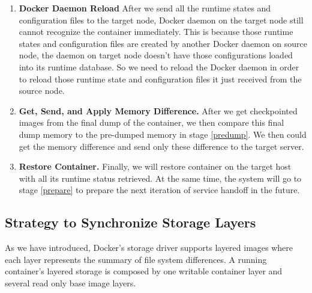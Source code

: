 \begin{enumerate}[label=\textbf{S\arabic*}]
\item \label{daemon-Reload} \textbf{Docker Daemon Reload} After we send all the runtime states and configuration files to the target node, Docker daemon on the target node still cannot recognize the container immediately.  This is because those runtime states and configuration files are created by another Docker daemon on source node, the daemon on target node doesn't have those configurations loaded into its runtime database. So we need to reload the Docker daemon in order to reload those runtime state and configuration files it just received from the source node.

\item \label{img-sync} \textbf{Get, Send, and Apply Memory Difference.} After we get checkpointed images from the final dump of the container, we then compare this final dump memory to the pre-dumped memory in stage \ref{predump}. We then could get the memory difference and send only these difference to the target server. 

\item \label{restore} \textbf{Restore Container.} Finally, we will restore container on the target host with all its runtime status retrieved. At the same time, the system will go to stage \ref{prepare} to prepare the next iteration of service handoff in the future.

\end{enumerate}



% 
% 

\subsection{Strategy to Synchronize Storage Layers} \label{design:mapImage}

As we have introduced, Docker's storage driver supports layered images where each layer represents the summary of file system differences. A running container's layered storage is composed by one writable container layer and several read only base image layers. 

